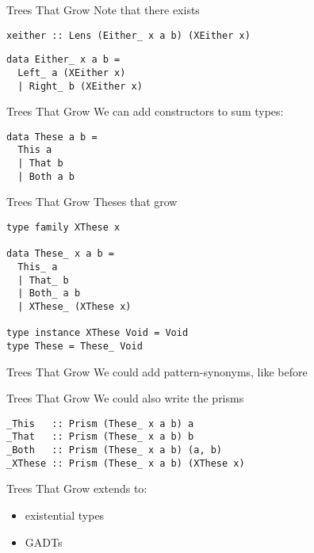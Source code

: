 \begin{frame}[fragile]
\begin{block}{Trees That Grow}
Note that there exists
\begin{lstlisting}[style=haskell]
xeither :: Lens (Either_ x a b) (XEither x)
\end{lstlisting}
\begin{lstlisting}[style=haskell]
data Either_ x a b =
  Left_ a (XEither x)
  | Right_ b (XEither x)
\end{lstlisting}
\end{block}
\end{frame}
\begin{frame}[fragile]

\begin{block}{Trees That Grow}
We can add constructors to sum types:
\begin{lstlisting}[style=haskell]
data These a b =
  This a
  | That b
  | Both a b
\end{lstlisting}
\end{block}
\end{frame}

\begin{frame}[fragile]
\begin{block}{Trees That Grow}
Theses that grow
\begin{lstlisting}[style=haskell]
type family XThese x

data These_ x a b =
  This_ a
  | That_ b
  | Both_ a b
  | XThese_ (XThese x)

type instance XThese Void = Void
type These = These_ Void
\end{lstlisting}
\end{block}
\end{frame}

\begin{frame}[fragile]
\begin{block}{Trees That Grow}
We could add pattern-synonyms, like before
\end{block}
\end{frame}
 
\begin{frame}[fragile]
\begin{block}{Trees That Grow}
We could also write the prisms
\begin{lstlisting}[style=haskell]
_This   :: Prism (These_ x a b) a
_That   :: Prism (These_ x a b) b
_Both   :: Prism (These_ x a b) (a, b)
_XThese :: Prism (These_ x a b) (XThese x)
\end{lstlisting}
\end{block}
\end{frame}

\begin{frame}[fragile]
\begin{block}{Trees That Grow extends to:\cite{najd2016trees}}
\begin{itemize}
\item existential types
\item GADTs
\end{itemize}
\end{block}
\end{frame}
